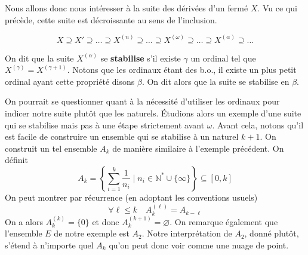 \noindent Nous allons donc nous intéresser à la suite des dérivées d'un fermé $X$. Vu ce qui précède, cette suite est décroissante au sens de l'inclusion.

\[
X\supseteq X'\supseteq \dots \supseteq X^{(n)}\supseteq \dots \supseteq X^{(\omega)}\supseteq \dots \supseteq X^{(\alpha)}\supseteq \dots
\]
\medskip

\noindent On dit que la suite $X^{(\alpha)}$ se \textbf{stabilise}  s'il existe $\gamma$ un ordinal tel que $X^{(\gamma)}= X^{(\gamma+1)}$. Notons que les ordinaux étant des b.o., il existe un plus petit ordinal ayant cette propriété disons $\beta$. On dit alors que la suite se stabilise en $\beta$.

\medskip

\noindent On pourrait se questionner quant à la nécessité d'utiliser les ordinaux pour indicer notre suite plutôt que les naturels. Étudions alors un exemple d'une suite qui se stabilise mais pas à une étape strictement avant $\omega$. Avant cela, notons qu'il est facile de construire un ensemble qui se stabilise à un naturel $k+1$. On construit un tel ensemble $A_k$ de manière similaire à l'exemple précédent. On définit $$A_k=\left\{\sum_{i=1}^k\frac{1}{n_i}\mid n_i\in \mathbb{N}^*\cup\{\infty\}\right\}\subseteq [0,k]$$
On peut montrer par récurrence (en adoptant les conventions usuels)
\[
\forall \ell \leq k \quad A^{(\ell)}_k=A_{k-\ell}
\]
On a alors $A^{(k)}_k= \{0\}$ et donc $A_k^{(k+1)}= \varnothing$.
\newpage
\noindent On remarque également que l'ensemble $E$ de notre exemple est $A_2$. Notre interprétation de $A_2$, donné plutôt, s'étend à n'importe quel $A_k$ qu'on peut donc voir comme une nuage de point.

\medskip

